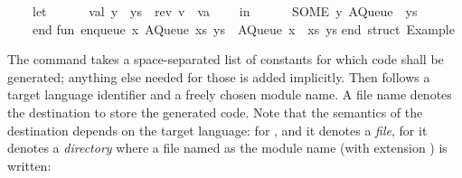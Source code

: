 \begin{isabellebody}
\begin{isamarkuptext}
\ \ \ \ let\isanewline
\ \ \ \ \ \ val\ y\ {}{}\ ys\ {}\ rev\ {}v\ {}{}\ va{}{}\isanewline
\ \ \ \ in\isanewline
\ \ \ \ \ \ {}SOME\ y{}\ AQueue\ {}{}{}{}\ ys{}{}\isanewline
\ \ \ \ end{}\isanewline
\isanewline
fun\ enqueue\ x\ {}AQueue\ {}xs{}\ ys{}{}\ {}\ AQueue\ {}x\ {}{}\ xs{}\ ys{}{}\isanewline
\isanewline
end{}\ {}{}struct\ Example{}{}\isanewline%
\end{isamarkuptext}%
\isamarkuptrue%
%
\endisatagquotetypewriter
{\isafoldquotetypewriter}%
%
\isadelimquotetypewriter
%
\endisadelimquotetypewriter
%
\begin{isamarkuptext}%
\noindent The \hypertarget{command.export-code}{\hyperlink{command.export-code}{\mbox{}}} command takes a
  space-separated list of constants for which code shall be generated;
  anything else needed for those is added implicitly.  Then follows a
  target language identifier and a freely chosen module name.  A file
  name denotes the destination to store the generated code.  Note that
  the semantics of the destination depends on the target language: for
  ,  and  it denotes a \emph{file},
  for  it denotes a \emph{directory} where a file named as the
  module name (with extension ) is written:%
\end{isamarkuptext}%
\isamarkuptrue%
%
\isadelimquote

\end{isabellebody}
